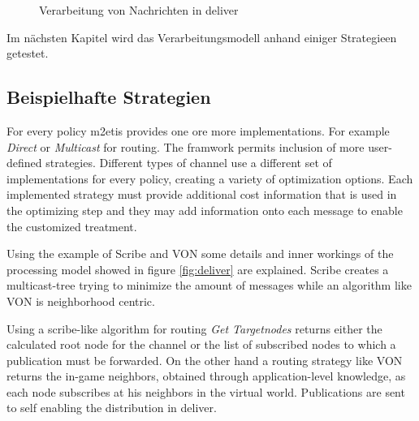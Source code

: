 \begin{figure}[htbp]
\centering
{}
\caption{Verarbeitung von Nachrichten in deliver}
\label{fig:processing_deliver}
\end{figure}

Im nächsten Kapitel wird das Verarbeitungsmodell anhand einiger Strategieen getestet.

\subsection{Beispielhafte Strategien}
For every policy \ac{m2etis} provides one ore more implementations. For example \emph{Direct} or \emph{Multicast} for routing. The framwork permits inclusion of more user-defined strategies. Different types of channel use a different set of implementations for every policy, creating a variety of optimization options. Each implemented strategy must provide additional cost information that is used in the optimizing step and they may add information onto each message to enable the customized treatment.

Using the example of Scribe \cite{Castro2002Scribe} and VON \cite{Hu2006VON} some details and inner workings of the processing model showed in figure \ref{fig:deliver} are explained. Scribe creates a multicast-tree trying to minimize the amount of messages while an algorithm like VON is neighborhood centric.

Using a scribe-like algorithm for routing \emph{Get Targetnodes} returns either the calculated root node for the channel or the list of subscribed nodes to which a publication must be forwarded. On the other hand a routing strategy like VON returns the in-game neighbors, obtained through application-level knowledge, as each node subscribes at his neighbors in the virtual world. Publications are sent to self enabling the distribution in deliver.

